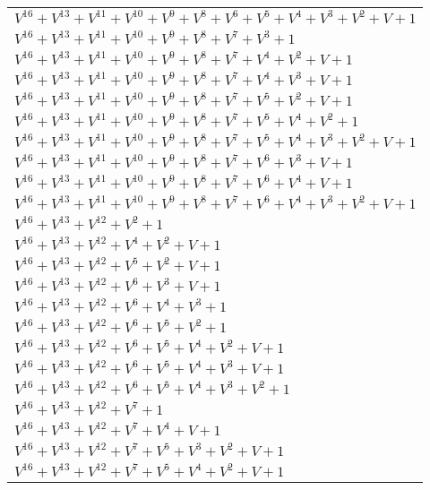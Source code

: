 \documentclass[12pt]{article}
\begin{document}
\begin{adjustwidth}{-4cm}{}
\begin{center}
\begin{longtable}{|l|}
$V^{16}  +V^{13}  +V^{11}  +V^{10}  +V^{9}  +V^{8}  +V^{6}  +V^{5}  +V^{4}  +V^{3}  +V^{2}  + V + 1$ \\
$V^{16}  +V^{13}  +V^{11}  +V^{10}  +V^{9}  +V^{8}  +V^{7}  +V^{3}  + 1$ \\
$V^{16}  +V^{13}  +V^{11}  +V^{10}  +V^{9}  +V^{8}  +V^{7}  +V^{4}  +V^{2}  + V + 1$ \\
$V^{16}  +V^{13}  +V^{11}  +V^{10}  +V^{9}  +V^{8}  +V^{7}  +V^{4}  +V^{3}  + V + 1$ \\
$V^{16}  +V^{13}  +V^{11}  +V^{10}  +V^{9}  +V^{8}  +V^{7}  +V^{5}  +V^{2}  + V + 1$ \\
$V^{16}  +V^{13}  +V^{11}  +V^{10}  +V^{9}  +V^{8}  +V^{7}  +V^{5}  +V^{4}  +V^{2}  + 1$ \\
$V^{16}  +V^{13}  +V^{11}  +V^{10}  +V^{9}  +V^{8}  +V^{7}  +V^{5}  +V^{4}  +V^{3}  +V^{2}  + V + 1$ \\
$V^{16}  +V^{13}  +V^{11}  +V^{10}  +V^{9}  +V^{8}  +V^{7}  +V^{6}  +V^{3}  + V + 1$ \\
$V^{16}  +V^{13}  +V^{11}  +V^{10}  +V^{9}  +V^{8}  +V^{7}  +V^{6}  +V^{4}  + V + 1$ \\
$V^{16}  +V^{13}  +V^{11}  +V^{10}  +V^{9}  +V^{8}  +V^{7}  +V^{6}  +V^{4}  +V^{3}  +V^{2}  + V + 1$ \\
$V^{16}  +V^{13}  +V^{12}  +V^{2}  + 1$ \\
$V^{16}  +V^{13}  +V^{12}  +V^{4}  +V^{2}  + V + 1$ \\
$V^{16}  +V^{13}  +V^{12}  +V^{5}  +V^{2}  + V + 1$ \\
$V^{16}  +V^{13}  +V^{12}  +V^{6}  +V^{3}  + V + 1$ \\
$V^{16}  +V^{13}  +V^{12}  +V^{6}  +V^{4}  +V^{3}  + 1$ \\
$V^{16}  +V^{13}  +V^{12}  +V^{6}  +V^{5}  +V^{2}  + 1$ \\
$V^{16}  +V^{13}  +V^{12}  +V^{6}  +V^{5}  +V^{4}  +V^{2}  + V + 1$ \\
$V^{16}  +V^{13}  +V^{12}  +V^{6}  +V^{5}  +V^{4}  +V^{3}  + V + 1$ \\
$V^{16}  +V^{13}  +V^{12}  +V^{6}  +V^{5}  +V^{4}  +V^{3}  +V^{2}  + 1$ \\
$V^{16}  +V^{13}  +V^{12}  +V^{7}  + 1$ \\
$V^{16}  +V^{13}  +V^{12}  +V^{7}  +V^{4}  + V + 1$ \\
$V^{16}  +V^{13}  +V^{12}  +V^{7}  +V^{5}  +V^{3}  +V^{2}  + V + 1$ \\
$V^{16}  +V^{13}  +V^{12}  +V^{7}  +V^{5}  +V^{4}  +V^{2}  + V + 1$ \\

\end{longtable}
\end{center}
\end{adjustwidth}
\end{document}
